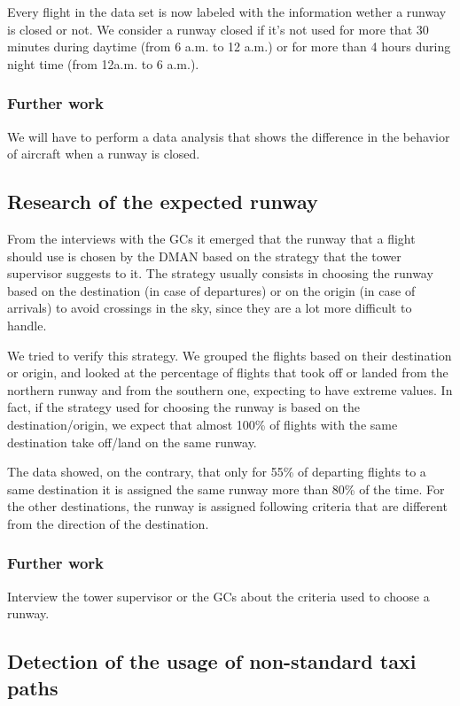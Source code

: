 \documentclass{article}
\begin{document}
Every flight in the data set is now labeled with the information wether a runway is closed or not. We consider a runway closed if it's not used for more that 30 minutes during daytime (from 6 a.m. to 12 a.m.) or for more than 4 hours during night time (from 12a.m. to 6 a.m.).

\subsubsection*{Further work}
We will have to perform a data analysis that shows the difference in the behavior of aircraft when a runway is closed.

\subsection{Research of the expected runway}

From the interviews with the GCs it emerged that the runway that a flight should use is chosen by the DMAN based on the strategy that the tower supervisor suggests to it. The strategy usually consists in choosing the runway based on the destination (in case of departures) or on the origin (in case of arrivals) to avoid crossings in the sky, since they are a lot more difficult to handle. 

We tried to verify this strategy. We grouped the flights based on their destination or origin, and looked at the percentage of flights that took off or landed from the northern runway and from the southern one, expecting to have extreme values. In fact, if the strategy used for choosing the runway is based on the destination/origin, we expect that almost 100\% of flights with the same destination take off/land on the same runway.

The data showed, on the contrary, that only for 55\% of departing flights to a same destination it is assigned the same runway more than 80\% of the time. For the other destinations, the runway is assigned following criteria that are different from the direction of the destination.

\subsubsection*{Further work}
Interview the tower supervisor or the GCs about the criteria used to choose a runway.

\subsection{Detection of the usage of non-standard taxi paths}
\end{document}
